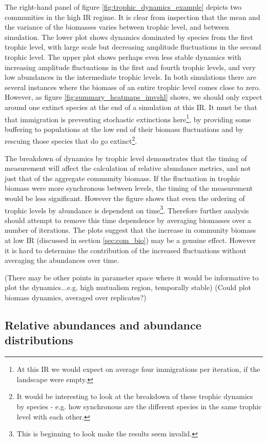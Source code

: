 \begin{itemize}
The right-hand panel of figure \ref{fig:trophic_dynamics_example} depicts two communities in the high IR regime. It is clear from inspection that the mean and the variance of the biomasses varies between trophic level, and between simulation. The lower plot shows dynamics dominated by species from the first trophic level, with large scale but decreasing amplitude fluctuations in the second trophic level. The upper plot shows perhaps even less stable dynamics with increasing amplitude fluctuations in the first and fourth trophic levels, and very low abundances in the intermediate trophic levels. In both simulations there are several instances where the biomass of an entire trophic level comes close to zero. However, as figure \ref{fig:summary_heatmaps_imvshl} shows, we should only expect around one extinct species at the end of a simulation at this IR. It must be that that immigration is preventing stochastic extinctions here\footnote{At this IR we would expect on average four immigrations per iteration, if the landscape were empty.}, by providing some buffering to populations at the low end of their biomass fluctuations and by rescuing those species that do go extinct\footnote{It would be interesting to look at the breakdown of these trophic dynamics by species - e.g. how synchronous are the different species in the same trophic level with each other.}.

The breakdown of dynamics by trophic level demonstrates that the timing of measurement will affect the calculation of relative abundance metrics, and not just that of the aggregate community biomass. If the fluctuation in trophic biomass were more synchronous between levels, the timing of the measurement would be less significant. However the figure shows that even the ordering of trophic levels by abundance is dependent on time\footnote{This is beginning to look make the results seem invalid.}. Therefore further analysis should attempt to remove this time dependence by averaging biomasses over a number of iterations. The plots suggest that the increase in community biomass at low IR (discussed in section \ref{sec:com_bio}) may be a genuine effect. However it is hard to determine the contribution of the increased fluctuations without averaging the abundances over time.

(There may be other points in parameter space where it would be informative to plot the dynamics...e.g. high mutualism region, temporally stable)
(Could plot biomass dynamics, averaged over replicates?)

\newpage
\subsection{Relative abundances and abundance distributions}
\label{sec:rel_abun}


\end{itemize}
